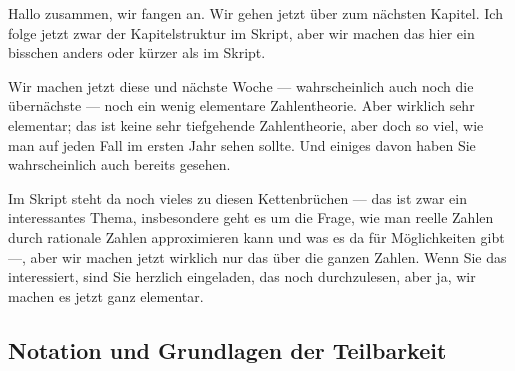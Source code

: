 \begin{spoken-clean}[00:00:00 - 00:02:15]
Hallo zusammen, wir fangen an. Wir gehen jetzt über zum nächsten Kapitel. Ich folge jetzt zwar der Kapitelstruktur im Skript, aber wir machen das hier ein bisschen anders oder kürzer als im Skript.

Wir machen jetzt diese und nächste Woche --- wahrscheinlich auch noch die übernächste --- noch ein wenig elementare Zahlentheorie. Aber wirklich sehr elementar; das ist keine sehr tiefgehende Zahlentheorie, aber doch so viel, wie man auf jeden Fall im ersten Jahr sehen sollte. Und einiges davon haben Sie wahrscheinlich auch bereits gesehen.

Im Skript steht da noch vieles zu diesen Kettenbrüchen --- das ist zwar ein interessantes Thema, insbesondere geht es um die Frage, wie man reelle Zahlen durch rationale Zahlen approximieren kann und was es da für Möglichkeiten gibt ---, aber wir machen jetzt wirklich nur das über die ganzen Zahlen. Wenn Sie das interessiert, sind Sie herzlich eingeladen, das noch durchzulesen, aber ja, wir machen es jetzt ganz elementar.
\end{spoken-clean}

\subsection{Notation und Grundlagen der Teilbarkeit}

